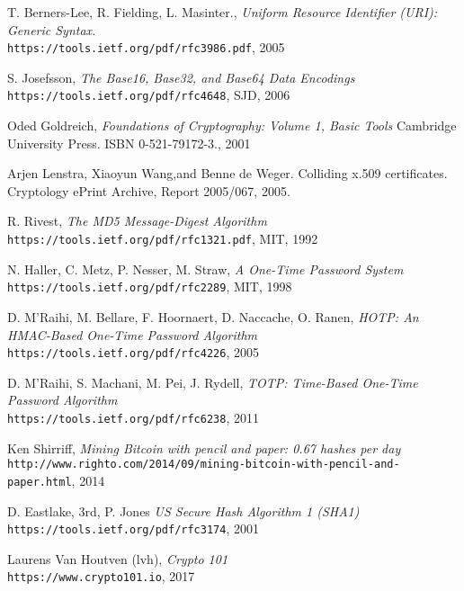 \begin{thebibliography}{9}

T. Berners-Lee, R. Fielding, L. Masinter.,
\textit{Uniform Resource Identifier (URI): Generic Syntax.} \\ 
\texttt{https://tools.ietf.org/pdf/rfc3986.pdf}, 2005

S. Josefsson,
\textit{The Base16, Base32, and Base64 Data Encodings} \\ 
\texttt{https://tools.ietf.org/pdf/rfc4648}, SJD, 2006

Oded Goldreich,
\textit{Foundations of Cryptography: Volume 1, Basic Tools}  
Cambridge University Press. ISBN 0-521-79172-3., 2001

Arjen Lenstra, Xiaoyun Wang,and Benne de Weger. Colliding
x.509 certificates. Cryptology ePrint Archive, Report 2005/067,
2005.

R. Rivest,
\textit{The MD5 Message-Digest Algorithm} \\ 
\texttt{https://tools.ietf.org/pdf/rfc1321.pdf}, MIT, 1992

N. Haller, C. Metz, P. Nesser, M. Straw, 
\textit{A One-Time Password System} \\ 
\texttt{https://tools.ietf.org/pdf/rfc2289}, MIT, 1998

D. M'Raihi, M. Bellare, F. Hoornaert, D. Naccache, O. Ranen, 
\textit{HOTP: An HMAC-Based One-Time Password Algorithm} \\ 
\texttt{https://tools.ietf.org/pdf/rfc4226}, 2005

D. M'Raihi, S. Machani, M. Pei, J. Rydell,
\textit{TOTP: Time-Based One-Time Password Algorithm} \\ 
\texttt{https://tools.ietf.org/pdf/rfc6238}, 2011

Ken Shirriff,
\textit{Mining Bitcoin with pencil and paper: 0.67 hashes per day} \\ 
\texttt{http://www.righto.com/2014/09/mining-bitcoin-with-pencil-and-paper.html}, 2014

D. Eastlake, 3rd, P. Jones
\textit{US Secure Hash Algorithm 1 (SHA1)} \\ 
\texttt{https://tools.ietf.org/pdf/rfc3174}, 2001

Laurens Van Houtven (lvh),
\textit{Crypto 101} \\ 
\texttt{https://www.crypto101.io}, 2017


\end{thebibliography}
